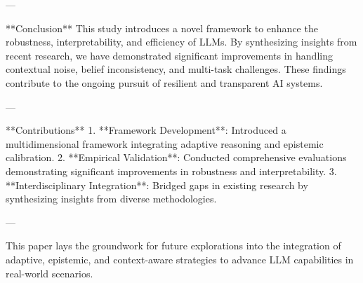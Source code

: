 ---

**Conclusion**  
This study introduces a novel framework to enhance the robustness, interpretability, and efficiency of LLMs. By synthesizing insights from recent research, we have demonstrated significant improvements in handling contextual noise, belief inconsistency, and multi-task challenges. These findings contribute to the ongoing pursuit of resilient and transparent AI systems.  

---

**Contributions**  
1. **Framework Development**: Introduced a multidimensional framework integrating adaptive reasoning and epistemic calibration.  
2. **Empirical Validation**: Conducted comprehensive evaluations demonstrating significant improvements in robustness and interpretability.  
3. **Interdisciplinary Integration**: Bridged gaps in existing research by synthesizing insights from diverse methodologies.  

--- 

This paper lays the groundwork for future explorations into the integration of adaptive, epistemic, and context-aware strategies to advance LLM capabilities in real-world scenarios.